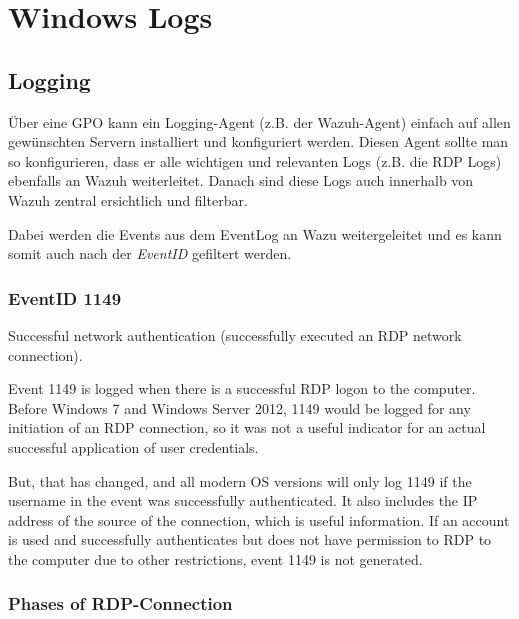 

\section{Windows Logs}




\subsection{Logging}
Über eine GPO kann ein Logging-Agent (z.B. der Wazuh-Agent) einfach auf allen gewünschten Servern installiert und konfiguriert werden.
Diesen Agent sollte man so konfigurieren, dass er alle wichtigen und relevanten Logs (z.B. die RDP Logs) ebenfalls an Wazuh weiterleitet.
Danach sind diese Logs auch innerhalb von Wazuh zentral ersichtlich und filterbar.

Dabei werden die Events aus dem EventLog an Wazu weitergeleitet und es kann somit auch nach der \textit{EventID} gefiltert werden.

\subsubsection{EventID 1149}
Successful network authentication (successfully executed an RDP network connection).

Event 1149 is logged when there is a successful RDP logon to the computer. Before Windows 7 and Windows Server 2012, 1149 would be logged for any initiation of an RDP connection, so it was not a useful indicator for an actual successful application of user credentials.

But, that has changed, and all modern OS versions will only log 1149 if the username in the event was successfully authenticated. It also includes the IP address of the source of the connection, which is useful information. If an account is used and successfully authenticates but does not have
permission to RDP to the computer due to other restrictions, event 1149 is not generated.


\subsubsection{Phases of RDP-Connection}

